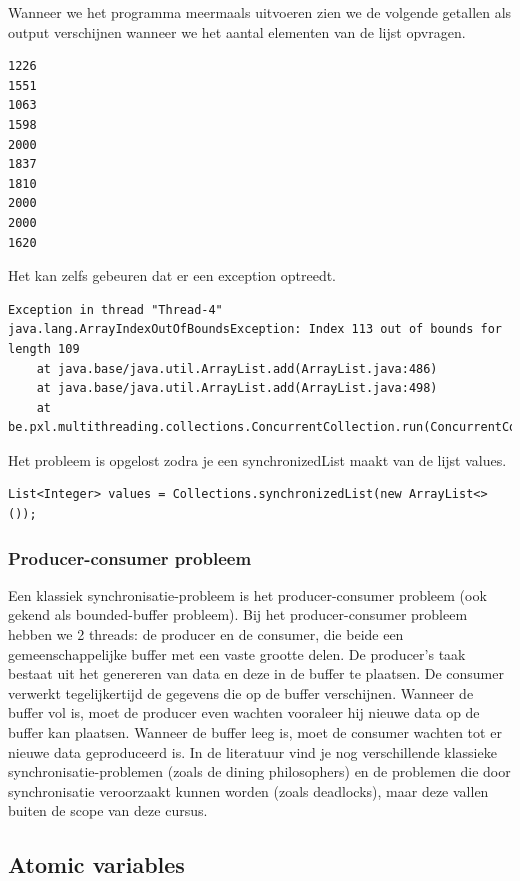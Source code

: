 \documentclass{tstextbook}
\begin{document}
Wanneer we het programma meermaals uitvoeren zien we de volgende getallen als output verschijnen wanneer we het aantal elementen van de lijst opvragen.

\begin{verbatim}
1226
1551
1063
1598
2000
1837
1810
2000
2000
1620
\end{verbatim}


Het kan zelfs gebeuren dat er een exception optreedt.
\begin{verbatim}
Exception in thread "Thread-4" java.lang.ArrayIndexOutOfBoundsException: Index 113 out of bounds for length 109
	at java.base/java.util.ArrayList.add(ArrayList.java:486)
	at java.base/java.util.ArrayList.add(ArrayList.java:498)
	at be.pxl.multithreading.collections.ConcurrentCollection.run(ConcurrentCollection.java:20)
\end{verbatim}

Het probleem is opgelost zodra je een synchronizedList maakt van de lijst values.

\begin{lstlisting}
List<Integer> values = Collections.synchronizedList(new ArrayList<>());
\end{lstlisting}

\subsubsection{Producer-consumer probleem}

Een klassiek synchronisatie-probleem is het producer-consumer probleem (ook gekend als bounded-buffer probleem). Bij het producer-consumer probleem hebben we 2 threads: de producer en de consumer, die beide een gemeenschappelijke buffer met een vaste grootte delen. De producer's taak bestaat uit het genereren van data en deze in de buffer te plaatsen. De consumer verwerkt tegelijkertijd de gegevens die op de buffer verschijnen. Wanneer de buffer vol is, moet de producer even wachten vooraleer hij nieuwe data op de buffer kan plaatsen. Wanneer de buffer leeg is, moet de consumer wachten tot er nieuwe data geproduceerd is.
In de literatuur vind je nog verschillende klassieke synchronisatie-problemen (zoals de dining philosophers) en de problemen die door synchronisatie veroorzaakt kunnen worden (zoals deadlocks), maar deze vallen buiten de scope van deze cursus.

\subsection{Atomic variables}
\end{document}
